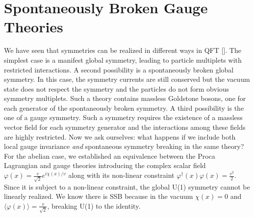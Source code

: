 \documentclass[../main.tex]{subfiles}
\begin{document}
\section{Spontaneously Broken Gauge Theories}%
We have seen that symmetries can be realized in different ways in QFT []. The simplest case is a manifest global symmetry, leading to particle multiplets with restricted interactions. A second possibility is a spontaneously broken global symmetry. In this case, the symmetry currents are still conserved but the vacuum state does not respect the symmetry and the particles do not form obvious symmetry multiplets. Such a theory contains massless Goldstone bosons, one for each generator of the spontaneously broken symmetry. A third possibility is the one of a gauge symmetry. Such a symmetry requires the existence of a massless vector field for each symmetry generator and the interactions among these fields are highly restricted. Now we ask ourselves: what happens if we include both local gauge invariance \textit{and} spontaneous symmetry breaking in the same theory?\\
For the abelian case, we established an equivalence between the Proca Lagrangian and gauge theories introducing the complex scalar field $\varphi(x)=\frac{v}{\sqrt{2}}e^{i\chi(x)/v}$ along with its non-linear constraint $\varphi^\dagger(x)\varphi(x)=\frac{v^2}{2}$. Since it is subject to a non-linear constraint, the global U(1) symmetry cannot be linearly realized. We know there is SSB because in the vacuum $\chi(x)=0$ and $\langle\varphi(x)\rangle=\frac{v}{\sqrt{2}}$, breaking U(1) to the identity.\\
\end{document}
